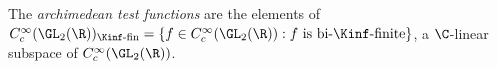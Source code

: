 The \emph{archimedean test functions} are the elements of
$C_c^\infty(\GL_2(\R))_{\Kinf\text{-fin}}=\{f\in C_c^\infty(\GL_2(\R)): f\text{ is bi-}\Kinf\text{-finite}\}$, a
$\C$-linear subspace of $C_c^\infty(\GL_2(\R))$.
